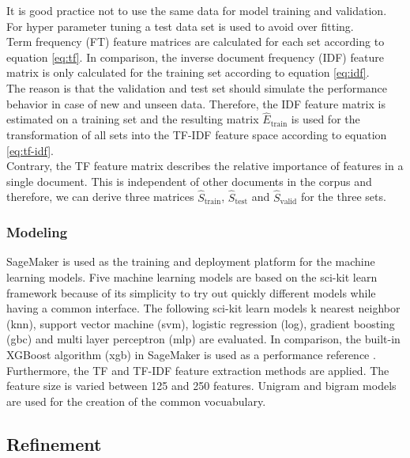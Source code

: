 \documentclass[a4paper,12pt,nottoc]{article}
\begin{document}
\noindent It is good practice not to use the same data for model training and validation. For hyper parameter tuning a test data set is used to avoid over fitting.\\

\noindent Term frequency (FT) feature matrices are calculated for each set according to equation \ref{eq:tf}. In comparison, the inverse document frequency (IDF) feature matrix is only calculated for the training set according to equation \ref{eq:idf}.\\

\noindent The reason is that the validation and test set should simulate the performance behavior in case of new and unseen data. Therefore, the IDF feature matrix is estimated on a training set and the resulting matrix $\hat{E}_{\textrm{train}}$ is used for the transformation of all sets into the TF-IDF feature space according to equation \ref{eq:tf-idf}.\\

\noindent Contrary, the TF feature matrix describes the relative importance of features in a single document. This is independent of other documents in the corpus and therefore, we can derive three matrices $\hat{S}_{\textrm{train}}$, $\hat{S}_{\textrm{test}}$ and $\hat{S}_{\textrm{valid}}$ for the three sets.

\subsubsection{Modeling}

\noindent SageMaker \cite{bib:sagemaker} is used as the training and deployment platform for the machine learning models. Five  machine learning models are based on the sci-kit learn framework \cite{bib:scikit-learn} because of its simplicity to try out quickly different models while having a common interface. The following sci-kit learn models k nearest neighbor (knn), support vector machine (svm), logistic regression (log), gradient boosting (gbc) and multi layer perceptron (mlp) are evaluated. In comparison, the built-in XGBoost algorithm (xgb) in SageMaker is used as a performance reference \cite{bib:xgb}. Furthermore, the TF and TF-IDF feature extraction methods are applied. The feature size is varied between 125 and 250 features. Unigram and bigram models are used for the creation of the common vocuabulary.

\clearpage
\subsection{Refinement}
\end{document}
